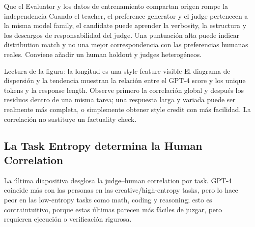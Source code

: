 
\begin{warningbox}{Que el Evaluator y los datos de entrenamiento compartan origen rompe la independencia}
Cuando el teacher, el preference generator y el judge pertenecen a la misma model family, el candidate puede aprender la verbosity, la estructura y los descargos de responsabilidad del judge. Una puntuación alta puede indicar distribution match y no una mejor correspondencia con las preferencias humanas reales. Conviene añadir un human holdout y judges heterogéneos.
\end{warningbox}


\begin{knowledgebox}{Lectura de la figura: la longitud es una style feature visible}
El diagrama de dispersión y la tendencia muestran la relación entre el GPT-4 score y los unique tokens y la response length. Observe primero la correlación global y después los residuos dentro de una misma tarea; una respuesta larga y variada puede ser realmente más completa, o simplemente obtener style credit con más facilidad. La correlación no sustituye un factuality check.
\end{knowledgebox}


\subsection{La Task Entropy determina la Human Correlation}

La última diapositiva desglosa la judge--human correlation por task. GPT-4 coincide más con las personas en las creative/high-entropy tasks, pero lo hace peor en las low-entropy tasks como math, coding y reasoning; esto es contraintuitivo, porque estas últimas parecen más fáciles de juzgar, pero requieren ejecución o verificación rigurosa.


